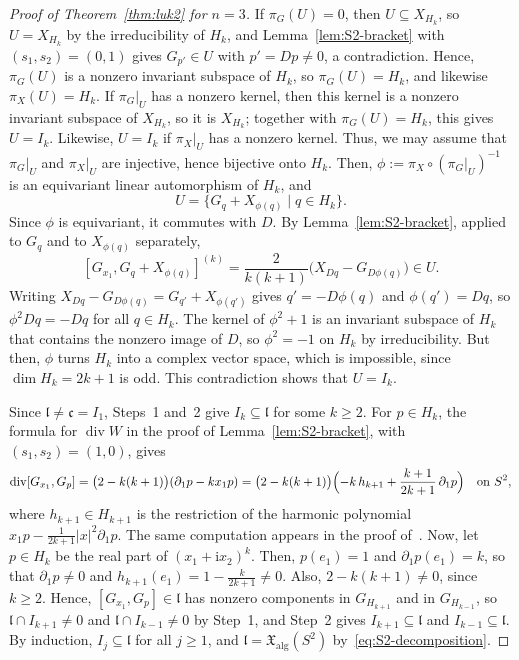 \documentclass{article}
\newcommand{\frakc}{\mathfrak{c}}
\newcommand{\xalg}{\mathfrak X_{\mathrm{alg}}}
\newcommand{\xc}[1]{\vspace{.1cm}
\noindent {\em #1} }
\theoremstyle{definition}
\theoremstyle{plain}
\begin{document}
\begin{proof}[Proof of Theorem~\ref{thm:luk2} for $n=3$]
If $\pi_G(U)=0$, then $U\subseteq X_{H_k}$, so $U=X_{H_k}$ by the irreducibility of $H_k$,
    and Lemma~\ref{lem:S2-bracket} with $(s_1,s_2)=(0,1)$ gives $G_{p'}\in U$ with $p'=Dp\neq0$, a contradiction.
Hence, $\pi_G(U)$ is a nonzero invariant subspace of $H_k$, so $\pi_G(U)=H_k$, and likewise $\pi_X(U)=H_k$.
If $\pi_G|_U$ has a nonzero kernel, then this kernel is a nonzero invariant subspace of $X_{H_k}$, so it is $X_{H_k}$; together with $\pi_G(U)=H_k$, this gives $U=I_k$.
Likewise, $U=I_k$ if $\pi_X|_U$ has a nonzero kernel.
Thus, we may assume that $\pi_G|_U$ and $\pi_X|_U$ are injective, hence bijective onto $H_k$.
Then, $\phi:=\pi_X\circ(\pi_G|_U)^{-1}$ is an equivariant linear automorphism of $H_k$, and
$$
U=\{G_q+X_{\phi(q)}\mid q\in H_k\}.
$$
Since $\phi$ is equivariant, it commutes with $D$.
By Lemma~\ref{lem:S2-bracket}, applied to $G_q$ and to $X_{\phi(q)}$ separately,
$$
    [G_{x_1},G_q+X_{\phi(q)}]^{(k)}=\frac{2}{k(k+1)}\bigl(X_{Dq}-G_{D\phi(q)}\bigr)\in U.
$$
Writing $X_{Dq}-G_{D\phi(q)}=G_{q'}+X_{\phi(q')}$ gives $q'=-D\phi(q)$ and $\phi(q')=Dq$, so $\phi^2Dq=-Dq$ for all $q\in H_k$.
The kernel of $\phi^2+1$ is an invariant subspace of $H_k$ that contains the nonzero image of $D$, so $\phi^2=-1$ on $H_k$ by irreducibility.
But then, $\phi$ turns $H_k$ into a complex vector space, which is impossible, since $\dim H_k=2k+1$ is odd.
This contradiction shows that $U=I_k$.

\xc{Step~3: propagation.}
Since $\mathfrak l\neq\frakc=I_1$, Steps~1 and~2 give $I_k\subseteq\mathfrak l$ for some $k\geq2$.
For $p\in H_k$, the formula for $\operatorname{div}W$ in the proof of Lemma~\ref{lem:S2-bracket}, with $(s_1,s_2)=(1,0)$, gives
$$
\operatorname{div}[G_{x_1},G_p]=\bigl(2-k(k+1)\bigr)(\partial_1p-kx_1p)
=\bigl(2-k(k+1)\bigr)\Bigl(-k\,h_{k+1}+\frac{k+1}{2k+1}\,\partial_1p\Bigr)
\quad\mbox{on } S^2,
$$
where $h_{k+1}\in H_{k+1}$ is the restriction of the harmonic polynomial $x_1p-\frac{1}{2k+1}|x|^2\partial_1p$.
The same computation appears in the proof of~\cite[Lemma~2]{Luk77}.
Now, let $p\in H_k$ be the real part of $(x_1+\mathrm{i}x_2)^k$.
Then, $p(e_1)=1$ and $\partial_1p(e_1)=k$, so that $\partial_1p\neq0$ and $h_{k+1}(e_1)=1-\frac{k}{2k+1}\neq0$.
Also, $2-k(k+1)\neq0$, since $k\geq2$.
Hence, $[G_{x_1},G_p]\in\mathfrak l$ has nonzero components in $G_{H_{k+1}}$ and in $G_{H_{k-1}}$, so $\mathfrak l\cap I_{k+1}\neq0$ and $\mathfrak l\cap I_{k-1}\neq0$ by Step~1, and Step~2 gives $I_{k+1}\subseteq\mathfrak l$ and $I_{k-1}\subseteq\mathfrak l$.
By induction, $I_j\subseteq\mathfrak l$ for all $j\geq1$, and $\mathfrak l=\xalg(S^2)$ by~\eqref{eq:S2-decomposition}.
\end{proof}

\printbibliography
\end{document}
